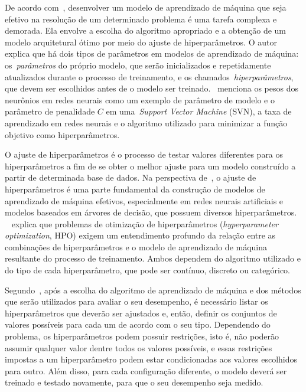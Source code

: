 De acordo com~, desenvolver um modelo de aprendizado de máquina que seja efetivo na resolução de um determinado problema é uma tarefa complexa e demorada. Ela envolve a escolha do algoritmo apropriado e a obtenção de um modelo arquitetural ótimo por meio do ajuste de hiperparâmetros. O autor explica que há dois tipos de parâmetros em modelos de aprendizado de máquina: os~\textit{parâmetros} do próprio modelo, que serão inicializados e repetidamente atualizados durante o processo de treinamento, e os chamados~\textit{hiperparâmetros}, que devem ser escolhidos antes de o modelo ser treinado.~ menciona os pesos dos neurônios em redes neurais como um exemplo de parâmetro de modelo e o parâmetro de penalidade $C$ em uma~\textit{Support Vector Machine} (SVN), a taxa de aprendizado em redes neurais e o algoritmo utilizado para minimizar a função objetivo como hiperparâmetros.

O ajuste de hiperparâmetros é o processo de testar valores diferentes para os hiperparâmetros a fim de se obter o melhor ajuste para um modelo construído a partir de determinada base de dados. Na perspectiva de~, o ajuste de hiperparâmetros é uma parte fundamental da construção de modelos de aprendizado de máquina efetivos, especialmente em redes neurais artificiais e modelos baseados em árvores de decisão, que possuem diversos hiperparâmetros.
~ explica que problemas de otimização de hiperparâmetros (\textit{hyperparameter optimization}, HPO) exigem um entendimento profundo da relação entre as combinações de hiperparâmetros e o modelo de aprendizado de máquina resultante do processo de treinamento. Ambos dependem do algoritmo utilizado e do tipo de cada hiperparâmetro, que pode ser contínuo, discreto ou categórico.

Segundo~, após a escolha do algoritmo de aprendizado de máquina e dos métodos que serão utilizados para avaliar o seu desempenho, é necessário listar os hiperparâmetros que deverão ser ajustados e, então, definir os conjuntos de valores possíveis para cada um de acordo com o seu tipo. Dependendo do problema, os hiperparâmetros podem possuir restrições, isto é, não poderão assumir qualquer valor dentre todos os valores possíveis, e essas restrições impostas a um hiperparâmetro podem estar condicionadas aos valores escolhidos para outro. Além disso, para cada configuração diferente, o modelo deverá ser treinado e testado novamente, para que o seu desempenho seja medido.


